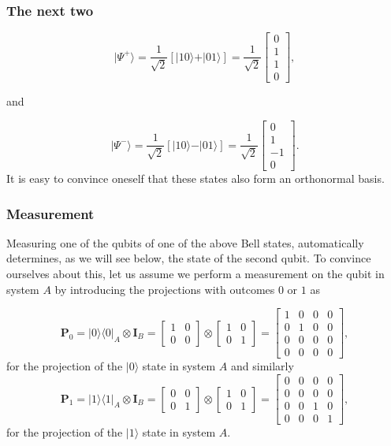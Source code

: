 \documentclass{beamer}
\begin{document}
\begin{frame}
\frametitle{The next two}

\[
\vert \Psi^+\rangle = \frac{1}{\sqrt{2}}\left[\vert 10\rangle +\vert 01\rangle\right]=\frac{1}{\sqrt{2}}\begin{bmatrix} 0 \\ 1 \\ 1 \\ 0\end{bmatrix},
\]

and

\[
\vert \Psi^-\rangle = \frac{1}{\sqrt{2}}\left[\vert 10\rangle -\vert 01\rangle\right]=\frac{1}{\sqrt{2}}\begin{bmatrix} 0 \\ 1 \\ -1 \\ 0\end{bmatrix}.
\]
It is easy to convince oneself that these states also form an orthonormal basis.
\end{frame}

\begin{frame}
\frametitle{Measurement}

Measuring one of the qubits of one of the above Bell states,
automatically determines, as we will see below, the state of the
second qubit. To convince ourselves about this, let us assume we perform a measurement on the qubit in system $A$ by introducing the projections with outcomes $0$ or $1$ as

\[
\bm{P}_0=\vert 0\rangle\langle 0\vert_A\otimes \bm{I}_B=\begin{bmatrix} 1 & 0\\ 0 & 0\end{bmatrix}\otimes\begin{bmatrix} 1& 0 \\ 0 & 1\end{bmatrix}=\begin{bmatrix} 1 & 0 & 0 & 0 \\ 0 & 1 & 0 & 0 \\ 0 & 0 & 0 & 0 \\ 0 & 0 & 0 & 0\end{bmatrix},
\]
for the projection of the $\vert 0 \rangle$ state in system $A$ and similarly
\[
\bm{P}_1=\vert 1\rangle\langle 1\vert_A\otimes \bm{I}_B=\begin{bmatrix} 0 & 0\\ 0 & 1\end{bmatrix}\otimes\begin{bmatrix} 1& 0 \\ 0 & 1\end{bmatrix}=\begin{bmatrix} 0 & 0 & 0 & 0 \\ 0 & 0 & 0 & 0 \\ 0 & 0 & 1 & 0 \\ 0 & 0 & 0 & 1\end{bmatrix},
\]
for the projection of the $\vert 1 \rangle$ state in system $A$.
\end{frame}
\end{document}
